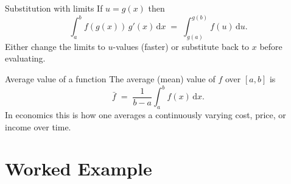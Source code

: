 \begin{rulebox}{Substitution with limits}
If $u=g(x)$ then
\[
  \int_{a}^{b} f(g(x))\,g'(x)\,\mathrm{d}x \;=\; \int_{g(a)}^{g(b)} f(u)\,\mathrm{d}u .
\]
Either change the limits to $u$-values (faster) or substitute back to $x$
before evaluating.
\end{rulebox}

\begin{rulebox}{Average value of a function}
The average (mean) value of $f$ over $[a,b]$ is
\[
  \bar f \;=\; \frac{1}{b-a}\int_{a}^{b} f(x)\,\mathrm{d}x .
\]
In economics this is how one averages a continuously varying cost,
price, or income over time.
\end{rulebox}

\section{Worked Example}

